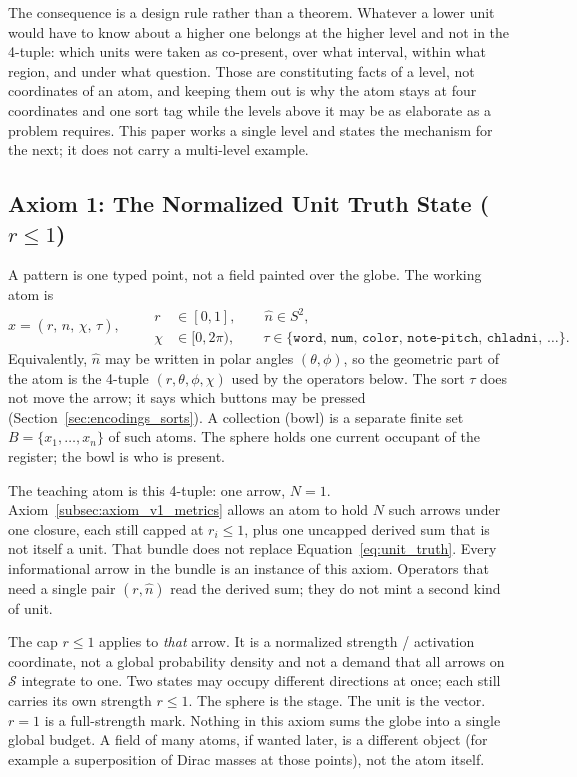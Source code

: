 \documentclass[12pt, a4paper]{article}
\begin{document}
The consequence is a design rule rather than a theorem. Whatever a
lower unit would have to know about a higher one belongs at the higher
level and not in the 4-tuple: which units were taken as co-present,
over what interval, within what region, and under what question. Those
are constituting facts of a level, not coordinates of an atom, and
keeping them out is why the atom stays at four coordinates and one
sort tag while the levels above it may be as elaborate as a problem
requires. This paper works a single level and states the mechanism for
the next; it does not carry a multi-level example.

\subsection{Axiom 1: The Normalized Unit Truth State ($r \le 1$)}
\label{subsec:axiom1}
A pattern is one typed point, not a field painted over the globe. The working atom is
\begin{equation}
    x = (r,\,\hat n,\,\chi,\,\tau),
    \qquad
    \begin{aligned}
    r &\in [0,1],
    \qquad
    \hat n \in S^2,\\
    \chi &\in [0,2\pi),
    \qquad
    \tau \in \{\mathtt{word},\,\mathtt{num},\,\mathtt{color},\,\mathtt{note\text{-}pitch},\,\mathtt{chladni},\,\ldots\}.
    \end{aligned}
    \label{eq:unit_truth}
\end{equation}
Equivalently, $\hat n$ may be written in polar angles $(\theta,\phi)$, so the geometric part of the atom is the 4-tuple $(r,\theta,\phi,\chi)$ used by the operators below. The sort $\tau$ does not move the arrow; it says which buttons may be pressed (Section~\ref{sec:encodings_sorts}). A collection (bowl) is a separate finite set $B=\{x_1,\ldots,x_n\}$ of such atoms. The sphere holds one current occupant of the register; the bowl is who is present.

The teaching atom is this 4-tuple: one arrow, $N=1$. Axiom~\ref{subsec:axiom_v1_metrics} allows an atom to hold $N$ such arrows under one closure, each still capped at $r_i\le 1$, plus one uncapped derived sum that is not itself a unit. That bundle does not replace Equation~\eqref{eq:unit_truth}. Every informational arrow in the bundle is an instance of this axiom. Operators that need a single pair $(r,\hat n)$ read the derived sum; they do not mint a second kind of unit.

The cap $r \le 1$ applies to \emph{that} arrow. It is a normalized strength / activation coordinate, not a global probability density and not a demand that all arrows on $\mathcal{S}$ integrate to one. Two states may occupy
different directions at once; each still carries its own strength
$r\le 1$. The sphere is the stage. The unit is the vector.
$r=1$ is a full-strength mark. Nothing in this axiom sums the globe
into a single global budget. A field of many atoms, if wanted later, is a different object (for example a superposition of Dirac masses at those points), not the atom itself.
\end{document}
